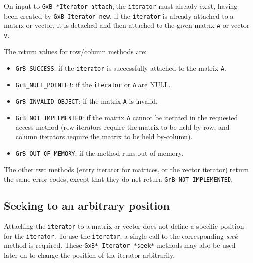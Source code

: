\documentclass[12pt]{article}
\begin{document}
On input to \verb'GxB_*Iterator_attach', the \verb'iterator' must already
exist, having been created by \verb'GxB_Iterator_new'.  If the \verb'iterator'
is already attached to a matrix or vector, it is detached and then attached to
the given matrix \verb'A' or vector \verb'v'.

The return values for row/column methods are:

    \begin{itemize}
    \item
    \verb'GrB_SUCCESS':         if the \verb'iterator' is successfully
        attached to the matrix \verb'A'.
    \item
    \verb'GrB_NULL_POINTER':    if the \verb'iterator' or \verb'A' are NULL.
    \item
    \verb'GrB_INVALID_OBJECT':  if the matrix \verb'A' is invalid.
    \item
    \verb'GrB_NOT_IMPLEMENTED': if the matrix \verb'A' cannot be iterated
        in the requested access method (row iterators require the matrix to
        be held by-row, and column iterators require the matrix to be held
        by-column).
    \item
    \verb'GrB_OUT_OF_MEMORY':   if the method runs out of memory.
    \end{itemize}

The other two methods (entry iterator for matrices, or the vector iterator)
return the same error codes, except that they
do not return \verb'GrB_NOT_IMPLEMENTED'.

\subsection{Seeking to an arbitrary position}

Attaching the \verb'iterator' to a matrix or vector does not define a specific
position for the \verb'iterator'.  To use the \verb'iterator', a single call to
the corresponding {\em seek} method is required.  These
\verb'GxB*_Iterator_*seek*' methods may also be used later on to change the
position of the iterator arbitrarily.
\end{document}
